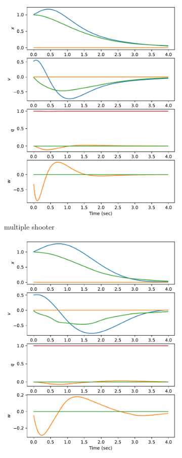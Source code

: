 \documentclass[]{article}
\begin{document}
\begin{figure}[H]
\begin{subfigure}[b]{0.3\textwidth}
		\includegraphics[width=\textwidth]{statex1z1vx3.pdf}
		\caption{multiple shooter}
	\end{subfigure}
	\begin{subfigure}[b]{0.3\textwidth}
		\centering
		\includegraphics[width=\textwidth]{statex1z1vx2.pdf}

\end{subfigure}
\end{figure}
\end{document}
